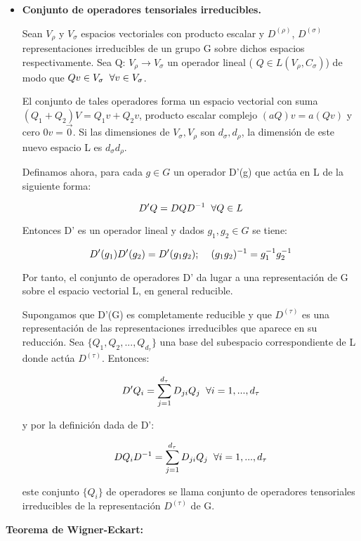 \begin{itemize}
\item \textbf{Conjunto de operadores tensoriales irreducibles.}

Sean $V_\rho$ y $V_\sigma$ espacios vectoriales con producto escalar y $D^{(\rho)}$, $D^{(\sigma)}$ representaciones irreducibles de un grupo G sobre dichos espacios respectivamente. Sea Q: $V_\rho \to V_\sigma$ un operador lineal ( $Q \in L(V_\rho ,C_\sigma)$) de modo que  $Qv\in V_\sigma \hspace{0.2cm} \forall v\in V_\sigma$.

El conjunto de tales operadores forma un espacio vectorial con suma $(Q_1+Q_2)V=Q_1v+Q_2v$, producto escalar complejo $(aQ)v=a(Qv)$ y cero $0v=\Vec{0}$. Si las dimensiones de $V_\sigma, V_\rho$ son $d_\sigma, d_ \rho$, la dimensión de este nuevo espacio L es $d_ \sigma d_\rho$.

Definamos ahora, para cada $g\in G$ un operador D'(g) que actúa en L de la siguiente forma:

$$D'Q=DQD^{-1} \hspace{0.2cm}\forall Q\in L$$

Entonces D' es un operador lineal y dados $g_1, g_2 \in G$ se tiene:

$$D'(g_1)D'(g_2)=D'(g_1g_2); \hspace{0.4cm} (g_1g_2)^{-1}=g_1^{-1}g_2^{-1}$$

Por tanto, el conjunto de operadores D' da lugar a una representación de G sobre el espacio vectorial L, en general reducible.

Supongamos que D'(G) es completamente reducible y que $D^{(\tau)}$ es una representación de las representaciones irreducibles que aparece en su reducción. Sea $\lbrace Q_1,Q_2,...,Q_{d_\tau}\rbrace$ una base del subespacio correspondiente de L donde actúa $D^{(\tau)}$. Entonces:

$$D'Q_i=\sum _{j=1}^{d_\tau} D_{ji}Q_j \hspace{0.2cm} \forall i=1,..., d_\tau$$

y por la definición dada de D':

$$DQ_iD^{-1}=\sum _{j=1}^{d_\tau} D_{ji}Q_j \hspace{0.2cm} \forall i=1,..., d_\tau$$

este conjunto $\lbrace Q_i\rbrace$ de operadores se llama conjunto de operadores tensoriales irreducibles de la representación $D^{(\tau)}$ de G.
\end{itemize}

\smallskip
\textbf{Teorema de Wigner-Eckart:}

